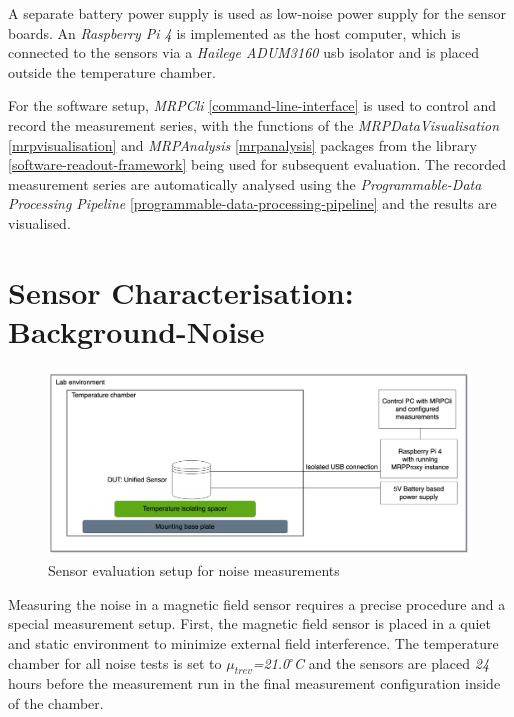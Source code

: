 A separate battery power supply is used as low-noise power supply for
the sensor boards. An \emph{Raspberry Pi 4} is implemented as the host
computer, which is connected to the sensors via a \emph{Hailege
ADUM3160} \gls{usb} isolator and is placed outside the temperature
chamber.

For the software setup, \emph{MRPCli} \ref{command-line-interface} is
used to control and record the measurement series, with the functions of
the \emph{MRPDataVisualisation} \ref{mrpvisualisation} and
\emph{MRPAnalysis} \ref{mrpanalysis} packages from the library
\ref{software-readout-framework} being used for subsequent evaluation.
The recorded measurement series are automatically analysed using the
\emph{Programmable-Data Processing Pipeline}
\ref{programmable-data-processing-pipeline} and the results are
visualised.

\hypertarget{sensor-characterisation-background-noise}{%
\section{Sensor Characterisation:
Background-Noise}\label{sensor-characterisation-background-noise}}

\begin{figure}
\centering
\includegraphics{./generated_images/border_Sensor_evaluation_setup_for_noise_measurements.png}
\caption{Sensor evaluation setup for noise measurements
\label{Sensor_evaluation_setup_for_noise_measurements.png}}
\end{figure}

Measuring the noise in a magnetic field sensor requires a precise
procedure and a special measurement setup. First, the magnetic field
sensor is placed in a quiet and static environment to minimize external
field interference. The temperature chamber for all noise tests is set
to \emph{\(\mu_{trev}\)=21.0\(^{\circ}\)C} and the sensors are placed
\emph{24} hours before the measurement run in the final measurement
configuration inside of the chamber.

